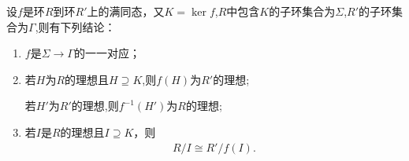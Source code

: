 \documentclass[../../main.tex]{subfiles}%
\begin{document}
\begin{theorem}\label{theorem:抽象代数--定理1.7.5}
设$f$是环$R$到环$R'$上的满同态，又$K = \ker f$,$R$中包含$K$的子环集合为$\Sigma$,$R'$的子环集合为$\Gamma$,则有下列结论：
\begin{enumerate}[(1)]
\item\label{theorem:抽象代数--定理1.7.5-1} $f$是$\Sigma\to \Gamma$的一一对应；

\item\label{theorem:抽象代数--定理1.7.5-2} 若$H$为$R$的理想且$H\supseteq K$,则$f(H)$为$R'$的理想;

若$H'$为$R'$的理想,则$f^{-1}(H')$为$R$的理想;

\item\label{theorem:抽象代数--定理1.7.5-3} 若$I$是$R$的理想且$I \supseteq K$，则
\begin{align}
R/I \cong R'/f(I) .\label{eq:1ger4wg34wgg54.7.g890u34349n8v4b7}
\end{align}
\end{enumerate}
\end{theorem}
\end{document}
